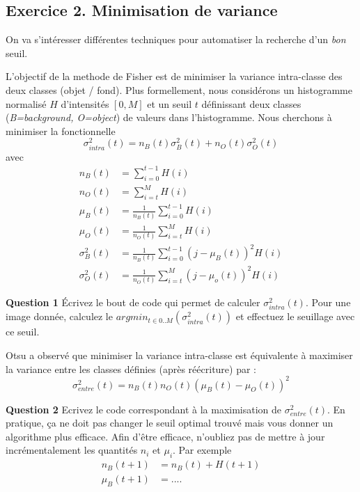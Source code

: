 \documentclass[a4paper, 11pt, french]{article}
\begin{document}
\subsection*{\bf Exercice 2. \rm Minimisation de variance}

On va s'intéresser différentes techniques pour automatiser la recherche d'un \emph{bon} seuil.

L'objectif de la methode de Fisher est de minimiser la variance intra-classe des deux classes (objet / fond).  Plus formellement, nous considérons un histogramme normalisé $H$ d'intensités $[0,M]$ et un seuil $t$ définissant deux classes (\emph{B=background, O=object}) de valeurs dans l'histogramme. Nous cherchons à minimiser la fonctionnelle
\begin{equation}
  \sigma^2_{intra}(t) = n_B(t)\sigma^2_B(t) + n_O(t)\sigma^2_O(t)
\end{equation}
avec
\begin{align}
  n_B(t)  &= \sum_{i=0}^{t-1} H(i)\\
  n_O(t)  &= \sum_{i=t}^{M} H(i)\\
\mu_B(t) &= \frac{1}{n_B(t)} \sum_{i=0}^{t-1} H(i)\\
\mu_O(t) &= \frac{1}{n_O(t)} \sum_{i=t}^{M} H(i)\\
\sigma^2_B(t) &= \frac{1}{n_B(t)} \sum_{i=0}^{t-1}(j-\mu_B(t))^2 H(i)\\
\sigma^2_O(t) &= \frac{1}{n_O(t)} \sum_{i=t}^{M}(j-\mu_o(t))^2 H(i)
\end{align}


{\bf Question 1} Écrivez le bout de code qui permet de calculer $\sigma^2_{intra}(t)$. Pour une image donnée, calculez le $argmin_{t\in{0..M}}(\sigma^2_{intra}(t))$ et effectuez le seuillage avec ce seuil.

Otsu a observé que minimiser la variance intra-classe est équivalente à maximiser la variance entre les classes définies (après réécriture) par :
\begin{equation}
   \sigma^2_{entre}(t) = n_B(t)n_O(t)\left(\mu_B(t) - \mu_O(t) \right ) ^2
\end{equation}

{\bf Question 2} Ecrivez le code correspondant à la maximisation de $\sigma^2_{entre}(t)$. En pratique, ça ne doit pas changer le seuil optimal trouvé mais vous donner un algorithme plus efficace. Afin d'être efficace, n'oubliez pas de mettre à jour incrémentalement les quantités $n_i$ et $\mu_i$. Par exemple
\begin{align}
  n_B(t+1) & = n_B(t) + H(t+1)\\
  \mu_B(t+1)& = ....
\end{align}
\end{document}
